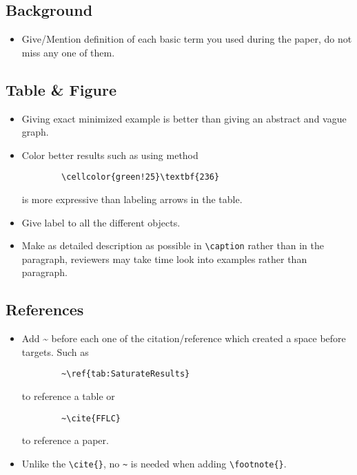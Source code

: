 \documentclass[acmsmall,screen,review]{acmart}
\begin{document}
\subsection{Background}
\begin{itemize}
    \item Give/Mention definition of each basic term you used during the paper, do not miss any one of them.
\end{itemize}

\subsection{Table \& Figure}
\begin{itemize}
    \item Giving exact minimized example is better than giving an abstract and vague graph.
    \item Color better results such as using method
    \begin{verbatim}
        \cellcolor{green!25}\textbf{236}
    \end{verbatim}
    \vspace{-\baselineskip}
    is more expressive than labeling arrows in the table.
    \item Give label to all the different objects.
    \item Make as detailed description as possible in \verb+\caption+ rather than in the paragraph, reviewers may take time look into examples rather than paragraph.
\end{itemize}

\subsection{References}
\begin{itemize}
    \item Add \textasciitilde{ } before each one of the citation/reference which created a space before targets. Such as
    \begin{verbatim}
        ~\ref{tab:SaturateResults}
    \end{verbatim}
    \vspace{-\baselineskip}
    to reference a table or
    \begin{verbatim}
        ~\cite{FFLC}
    \end{verbatim}
    \vspace{-\baselineskip}
    to reference a paper.
    \item Unlike the \verb+\cite{}+, no \verb+~+ is needed when adding \verb+\footnote{}+.
\end{itemize}
\end{document}
